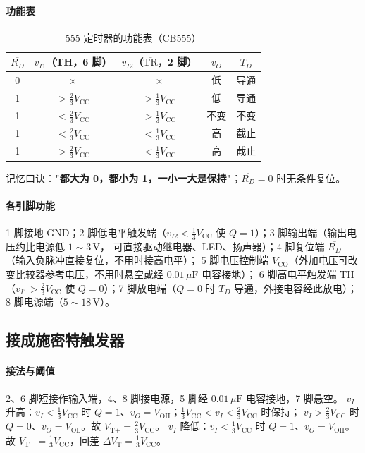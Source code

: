 \paragraph{功能表}
\begin{table}[htbp]
\centering
\caption{555 定时器的功能表（CB555）}
\begin{tabular}{ccccc}
\toprule
$\overline{R_D}$ & $v_{I1}$（TH，6 脚） & $v_{I2}$（$\overline{\text{TR}}$，2 脚） & $v_O$ & $T_D$ \\
\midrule
0 & $\times$ & $\times$ & 低 & 导通 \\
1 & $>\frac{2}{3}V_\text{CC}$ & $>\frac{1}{3}V_\text{CC}$ & 低 & 导通 \\
1 & $<\frac{2}{3}V_\text{CC}$ & $>\frac{1}{3}V_\text{CC}$ & 不变 & 不变 \\
1 & $<\frac{2}{3}V_\text{CC}$ & $<\frac{1}{3}V_\text{CC}$ & 高 & 截止 \\
1 & $>\frac{2}{3}V_\text{CC}$ & $<\frac{1}{3}V_\text{CC}$ & 高 & 截止 \\
\bottomrule
\end{tabular}
\end{table}
记忆口诀：\textbf{"都大为 0，都小为 1，一小一大是保持"}；$\overline{R_D}=0$ 时无条件复位。

\paragraph{各引脚功能}
1 脚接地 GND；2 脚低电平触发端（$v_{I2}<\frac{1}{3}V_\text{CC}$ 使 $Q=1$）；3 脚输出端（输出电压约比电源低 $1\sim3\,\mathrm{V}$，
可直接驱动继电器、LED、扬声器）；4 脚复位端 $\overline{R_D}$（输入负脉冲直接复位，不用时接高电平）；
5 脚电压控制端 $V_\text{CO}$（外加电压可改变比较器参考电压，不用时悬空或经 $0.01\,\mu\mathrm{F}$ 电容接地）；
6 脚高电平触发端 TH（$v_{I1}>\frac{2}{3}V_\text{CC}$ 使 $Q=0$）；7 脚放电端（$Q=0$ 时 $T_D$ 导通，外接电容经此放电）；
8 脚电源端（$5\sim18\,\mathrm{V}$）。

\subsection{接成施密特触发器}
\paragraph{接法与阈值}
2、6 脚短接作输入端，4、8 脚接电源，5 脚经 $0.01\,\mu\mathrm{F}$ 电容接地，7 脚悬空。
$v_I$ 升高：$v_I<\frac{1}{3}V_\text{CC}$ 时 $Q=1$、$v_O=V_\text{OH}$；$\frac{1}{3}V_\text{CC}<v_I<\frac{2}{3}V_\text{CC}$ 时保持；
$v_I>\frac{2}{3}V_\text{CC}$ 时 $Q=0$、$v_O=V_\text{OL}$。故 $V_{\text{T}+}=\frac{2}{3}V_\text{CC}$。
$v_I$ 降低：$v_I<\frac{1}{3}V_\text{CC}$ 时 $Q=1$、$v_O=V_\text{OH}$。故 $V_{\text{T}-}=\frac{1}{3}V_\text{CC}$，回差 $\Delta V_\text{T}=\frac{1}{3}V_\text{CC}$。

